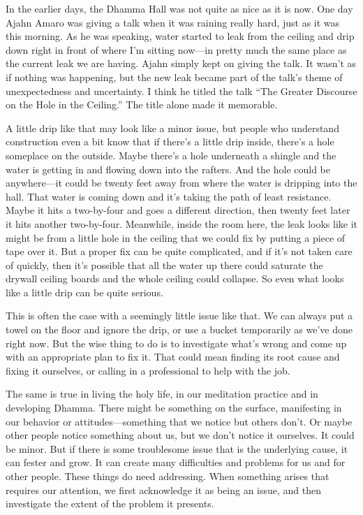 
In the earlier days, the Dhamma Hall was not quite as nice as it is 
now. One day Ajahn Amaro was giving a talk when it was raining really 
hard, just as it was this morning. As he was speaking, water started to 
leak from the ceiling and drip down right in front of where I'm sitting 
now---in pretty much the same place as the current leak we are having. 
Ajahn simply kept on giving the talk. It wasn't as if nothing was 
happening, but the new leak became part of the talk's theme of 
unexpectedness and uncertainty. I think he titled the talk ``The 
Greater Discourse on the Hole in the Ceiling.'' The title alone made it 
memorable.

A little drip like that may look like a minor issue, but people who 
understand construction even a bit know that if there's a little drip 
inside, there's a hole someplace on the outside. Maybe there's a hole 
underneath a shingle and the water is getting in and flowing down into 
the rafters. And the hole could be anywhere---it could be twenty feet 
away from where the water is dripping into the hall. That water is 
coming down and it's taking the path of least resistance. Maybe it hits 
a two-by-four and goes a different direction, then twenty feet later it 
hits another two-by-four. Meanwhile, inside the room here, the leak 
looks like it might be from a little hole in the ceiling that we could 
fix by putting a piece of tape over it. But a proper fix can be quite 
complicated, and if it's not taken care of quickly, then it's possible 
that all the water up there could saturate the drywall ceiling boards 
and the whole ceiling could collapse. So even what looks like a little 
drip can be quite serious.

This is often the case with a seemingly little issue like that. We can 
always put a towel on the floor and ignore the drip, or use a bucket 
temporarily as we've done right now. But the wise thing to do is to 
investigate what's wrong and come up with an appropriate plan to fix 
it. That could mean finding its root cause and fixing it ourselves, or 
calling in a professional to help with the job.

The same is true in living the holy life, in our meditation practice 
and in developing Dhamma. There might be something on the surface, 
manifesting in our behavior or attitudes---something that we notice but 
others don't. Or maybe other people notice something about us, but we 
don't notice it ourselves. It could be minor. But if there is some 
troublesome issue that is the underlying cause, it can fester and grow. 
It can create many difficulties and problems for us and for other 
people. These things do need addressing. When something arises that 
requires our attention, we first acknowledge it as being an issue, and 
then investigate the extent of the problem it presents.

